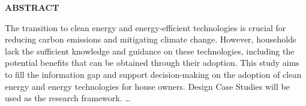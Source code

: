  \setcounter{page}{2}
\begin{center}
{\Large{\bf{ABSTRACT}}}
\end{center}

\noindent

The transition to clean energy and energy-efficient technologies is crucial for reducing carbon emissions and mitigating climate change. 
However, households lack the sufficient knowledge and guidance on these technologies, including the potential benefits that can be obtained through their adoption.
This study aims to fill the information gap and support decision-making on the adoption of clean energy and energy technologies for house owners. 
Design Case Studies will be used as the research framework. 
\dots
\clearpage